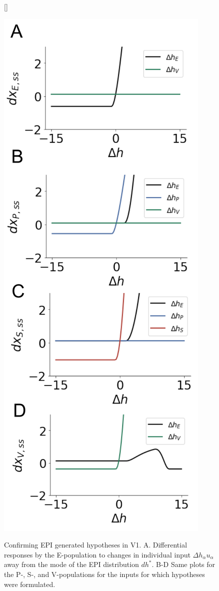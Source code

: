\documentclass[11pt]{article}
\begin{document}
\begin{figure}
[\FBwidth]
{\caption{Confirming EPI generated hypotheses in V1. A. Differential responses by the E-population to changes in individual input $\Delta h_\alpha u_\alpha$ away from the mode of the EPI distribution $dh^*$. B-D Same plots for the P-, S-, and V-populations for the inputs for which hypotheses were formulated.}}
{\includegraphics[scale=0.45]{figures/fig3/fig3.pdf}}
\end{figure}
\end{document}
